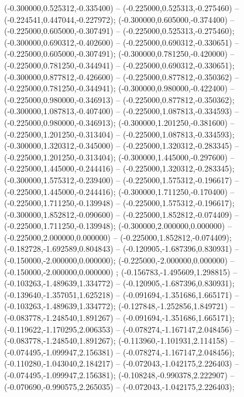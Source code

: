  (-0.300000,0.525312,-0.335400) -- (-0.225000,0.525313,-0.275460) -- (-0.224541,0.447044,-0.227972);
 (-0.300000,0.605000,-0.374400) -- (-0.225000,0.605000,-0.307491) -- (-0.225000,0.525313,-0.275460);
 (-0.300000,0.690312,-0.402600) -- (-0.225000,0.690312,-0.330651) -- (-0.225000,0.605000,-0.307491);
 (-0.300000,0.781250,-0.420000) -- (-0.225000,0.781250,-0.344941) -- (-0.225000,0.690312,-0.330651);
 (-0.300000,0.877812,-0.426600) -- (-0.225000,0.877812,-0.350362) -- (-0.225000,0.781250,-0.344941);
 (-0.300000,0.980000,-0.422400) -- (-0.225000,0.980000,-0.346913) -- (-0.225000,0.877812,-0.350362);
 (-0.300000,1.087813,-0.407400) -- (-0.225000,1.087813,-0.334593) -- (-0.225000,0.980000,-0.346913);
 (-0.300000,1.201250,-0.381600) -- (-0.225000,1.201250,-0.313404) -- (-0.225000,1.087813,-0.334593);
 (-0.300000,1.320312,-0.345000) -- (-0.225000,1.320312,-0.283345) -- (-0.225000,1.201250,-0.313404);
 (-0.300000,1.445000,-0.297600) -- (-0.225000,1.445000,-0.244416) -- (-0.225000,1.320312,-0.283345);
 (-0.300000,1.575312,-0.239400) -- (-0.225000,1.575312,-0.196617) -- (-0.225000,1.445000,-0.244416);
 (-0.300000,1.711250,-0.170400) -- (-0.225000,1.711250,-0.139948) -- (-0.225000,1.575312,-0.196617);
 (-0.300000,1.852812,-0.090600) -- (-0.225000,1.852812,-0.074409) -- (-0.225000,1.711250,-0.139948);
 (-0.300000,2.000000,0.000000) -- (-0.225000,2.000000,0.000000) -- (-0.225000,1.852812,-0.074409);
 (-0.182728,-1.692589,0.804843) -- (-0.120905,-1.687396,0.830931) -- (-0.150000,-2.000000,0.000000);
 (-0.225000,-2.000000,0.000000) -- (-0.150000,-2.000000,0.000000) ;
 (-0.156783,-1.495609,1.298815) -- (-0.103263,-1.489639,1.334772) -- (-0.120905,-1.687396,0.830931);
 (-0.139640,-1.357051,1.625218) -- (-0.091694,-1.351686,1.665171) -- (-0.103263,-1.489639,1.334772);
 (-0.127848,-1.252856,1.849721) -- (-0.083778,-1.248540,1.891267) -- (-0.091694,-1.351686,1.665171);
 (-0.119622,-1.170295,2.006353) -- (-0.078274,-1.167147,2.048456) -- (-0.083778,-1.248540,1.891267);
 (-0.113960,-1.101931,2.114158) -- (-0.074495,-1.099947,2.156381) -- (-0.078274,-1.167147,2.048456);
 (-0.110280,-1.043040,2.184217) -- (-0.072043,-1.042175,2.226403) -- (-0.074495,-1.099947,2.156381);
 (-0.108248,-0.990378,2.222907) -- (-0.070690,-0.990575,2.265035) -- (-0.072043,-1.042175,2.226403);
